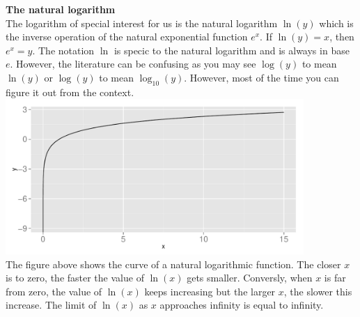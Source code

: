 \documentclass[a4paper]{report}
\begin{document}
\textbf{The natural logarithm}\\
The logarithm of special interest for us is the natural logarithm $\ln(y)$ which is the inverse operation of the natural exponential function $e^x$. If $\ln(y) = x$, then $e^x = y$. The notation $\ln$ is specic to the natural logarithm and is always in base $e$. However, the literature can be confusing as you may see $\log(y)$ to mean $\ln(y)$ or $\log(y)$ to mean $\log_{10}(y)$. However, most of the time you can figure it out from the context.\\
\includegraphics[width=0.85\textwidth]{ln_plot.pdf}\\
The figure above shows the curve of a natural logarithmic function. The closer $x$ is to zero, the faster the value of $\ln(x)$ gets smaller. Conversly, when $x$ is far from zero, the value of $\ln(x)$ keeps increasing but the larger $x$, the slower this increase. The limit of $\ln(x)$ as $x$ approaches infinity is equal to infinity.\\
\end{document}
